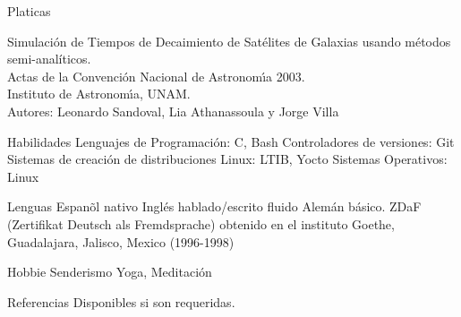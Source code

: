 \documentclass{resume}
\begin{document}
\begin{category}{Platicas}

\citembullet Simulaci\'on de Tiempos de Decaimiento de Sat\'elites de Galaxias usando m\'etodos semi-anal\'{i}ticos.\\
Actas de la Convenci\'on Nacional de Astronom\'{\i}a 2003.\\
Instituto de Astronom\'{\i}a, UNAM. \\
Autores: Leonardo Sandoval, Lia Athanassoula y Jorge Villa
\end{category}

\begin{category}{Habilidades}
\citembullet Lenguajes de Programaci\'on: C, Bash
\citembullet Controladores de versiones: Git
\citembullet Sistemas de creaci\'on de distribuciones Linux: LTIB, Yocto
\citembullet Sistemas Operativos: Linux
\end{category}

\begin{category}{Lenguas}
\citembullet Espan\~ol nativo
\citembullet Ingl\'es hablado/escrito fluido
\citembullet Alem\'an b\'asico. ZDaF (Zertifikat Deutsch als Fremdsprache) obtenido en el instituto Goethe, Guadalajara, Jalisco, Mexico (1996-1998)
\end{category}

\begin{category}{Hobbie}
\citembullet Senderismo
\citembullet Yoga, Meditaci\'on
\end{category}

\begin{category}{Referencias} 
\citemnobullet Disponibles si son requeridas.
\end{category}
\end{document}
